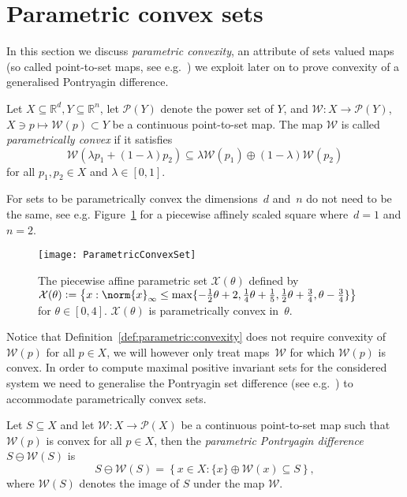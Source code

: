 \section{Parametric convex sets}\label{sec:parametric:convex:sets}
In this section we discuss \emph{parametric convexity}, an attribute of sets valued maps
(so called point-to-set maps, see e.g.~\cite{Hogan:1973}) we exploit later on to prove 
convexity of a generalised Pontryagin difference.
%
\begin{defi}\label{def:parametric:convexity}
	Let $X\subseteq\mathbb R^d, Y\subseteq\mathbb R^n$, let $\mathcal P(Y)$ denote the power set of $Y$, 
	and $\mathcal W:X\rightarrow \mathcal P(Y)$, $X\ni p\mapsto \mathcal W(p)\subset Y$ be a 
	continuous point-to-set map. The map $\mathcal W$ is called \emph{parametrically convex} if it satisfies
	\begin{equation}\label{eq:def:parametrically:convex}
	\mathcal W(\lambda p_1 + (1-\lambda)p_2)\subseteq\lambda \mathcal W(p_1) \oplus (1-\lambda) \mathcal W(p_2)
	\end{equation}
	for all $p_1,p_2\in X$ and $\lambda\in[0,1]$.
\end{defi}
%
For sets to be parametrically convex the dimensions~$d$ and~$n$ do not need to be the same, see e.g.
Figure~\ref{fig:parametrically:convex:set} for a piecewise affinely scaled square where~$d=1$ and $n=2$.
%
\begin{figure}
\centering
\texttt{[image: ParametricConvexSet]}
\caption[A parametrically convex set.]{The piecewise affine parametric set $\mathcal X(\theta)$ 
defined by $\mathcal X(\theta)\mathrel{\mathop:}=\left\{x:\norm{x}_\infty\leq\max\{-\frac{1}{2}
\theta+2,\frac{1}{4}\theta+\frac{1}{5},\frac{1}{2}\theta+\frac{3}{4},\theta-\frac{3}{4}\}\right\}$ 
for $\theta\in[0,4]$. $\mathcal X(\theta)$ is parametrically convex in~$\theta$.}
\label{fig:parametrically:convex:set}
\end{figure}
%
Notice that Definition~\ref{def:parametric:convexity} does not require convexity of~$\mathcal W(p)$ for all
$p\in X$, we will however only treat maps~$\mathcal W$ for which $\mathcal W(p)$ is convex.
%
In order to compute maximal positive invariant sets for the considered system we need to generalise
the Pontryagin set difference (see e.g.~\cite{blanchini:2007}) to accommodate parametrically convex sets.
%
\begin{defi}\label{def:parametric:pontryagin:difference}
	Let $S\subseteq X$ and let $\mathcal W:X\to\mathcal P(X)$ be a continuous point-to-set map such that
	$\mathcal W(p)$ is convex for all $p\in X$, then the \emph{parametric Pontryagin difference} 
	$S\ominus \mathcal W(S)$ is 
	\begin{equation}\label{eq:definition:parametric:pontryagin:difference}
		S\ominus \mathcal W(S) = \left\{x\in X: \{x\} \oplus \mathcal W(x)\subseteq S\right\},
	\end{equation}
	where $\mathcal W(S)$ denotes the image of $S$ under the map $\mathcal W$. 
\end{defi}
